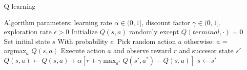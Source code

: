 \begin{algorithm}[H]
\caption{Q-learning}
\label{alg:q-learning}
\begin{algorithmic}
    \State Algorithm parameters: learning rate $\alpha \in (0, 1]$, discount factor $\gamma \in (0, 1]$, exploration rate $\epsilon > 0$
    \State Initialize $Q(s,a)$ randomly except $Q(terminal, \cdot) = 0$
        \State Set initial state $s$  
            \State With probability $\epsilon$:
            \State \hspace{\algorithmicindent} Pick random action $a$
            \State otherwise:
            \State \hspace{\algorithmicindent} $a$ = argmax$_a$ $Q(s, a)$
            \State Execute action $a$ and observe reward $r$ and succesor state $s'$
            \State$Q(s, a) \leftarrow Q(s, a) + \alpha[r + \gamma \max_{a^*} Q(s', a^*) - Q(s, a)]$
            \State $s \leftarrow s'$
        \EndWhile
    \EndWhile
\end{algorithmic}
\end{algorithm}
